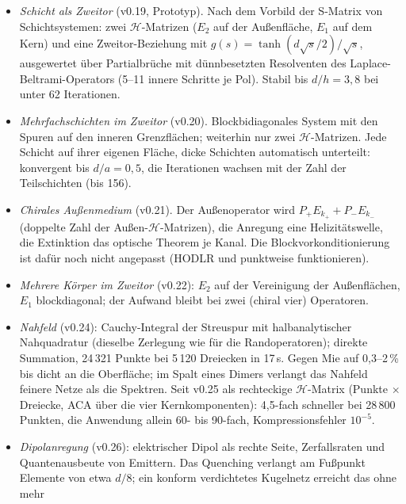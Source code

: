 \documentclass[11pt, a4paper]{article}
\begin{document}
\begin{itemize}[leftmargin=*]
    unverändert; der CD einer dünnen chiralen Hülle auf Gold konvergiert mit Ordnung~2 gegen eine Mie-Lösung für
    geschichtete chirale Kugeln (0,5--1\,\% bei $n=12$), die exakte Zwei-Flächen-Rechnung verfehlt ihn um 30--50\,\%.
    Spektrum einer Goldkugel mit chiraler Molekülhülle (v0.18): plasmoninduzierter CD an der Resonanz auf 2--7\,\%.
  \item \emph{Schicht als Zweitor} (v0.19, Prototyp). Nach dem Vorbild der S-Matrix von Schichtsystemen: zwei
    $\mathcal{H}$-Matrizen ($E_2$ auf der Außenfläche, $E_1$ auf dem Kern) und eine Zweitor-Beziehung mit
    $g(s)=\tanh(d\sqrt s/2)/\sqrt s$, ausgewertet über Partialbrüche mit dünnbesetzten Resolventen des
    Laplace-Beltrami-Operators (5--11 innere Schritte je Pol). Stabil bis $d/h=3{,}8$ bei unter 62 Iterationen.
  \item \emph{Mehrfachschichten im Zweitor} (v0.20). Blockbidiagonales System mit den Spuren auf den inneren
    Grenzflächen; weiterhin nur zwei $\mathcal{H}$-Matrizen. Jede Schicht auf ihrer eigenen Fläche, dicke Schichten
    automatisch unterteilt: konvergent bis $d/a=0{,}5$, die Iterationen wachsen mit der Zahl der Teilschichten (bis 156).
  \item \emph{Chirales Außenmedium} (v0.21). Der Außenoperator wird $P_+E_{k_+}+P_-E_{k_-}$ (doppelte Zahl der
    Außen-$\mathcal{H}$-Matrizen), die Anregung eine Helizitätswelle, die Extinktion das optische Theorem je Kanal. Die
    Blockvorkonditionierung ist dafür noch nicht angepasst (HODLR und punktweise funktionieren).
  \item \emph{Mehrere Körper im Zweitor} (v0.22): $E_2$ auf der Vereinigung der Außenflächen, $E_1$ blockdiagonal; der
    Aufwand bleibt bei zwei (chiral vier) Operatoren.
  \item \emph{Nahfeld} (v0.24): Cauchy-Integral der Streuspur mit halbanalytischer Nahquadratur (dieselbe Zerlegung wie für
    die Randoperatoren); direkte Summation, 24\,321 Punkte bei 5\,120 Dreiecken in 17\,s. Gegen Mie auf 0,3--2\,\% bis dicht an
    die Oberfläche; im Spalt eines Dimers verlangt das Nahfeld feinere Netze als die Spektren. Seit v0.25 als rechteckige
    $\mathcal{H}$-Matrix (Punkte $\times$ Dreiecke, ACA über die vier Kernkomponenten): 4,5-fach schneller bei 28\,800 Punkten,
    die Anwendung allein 60- bis 90-fach, Kompressionsfehler $10^{-5}$.
  \item \emph{Dipolanregung} (v0.26): elektrischer Dipol als rechte Seite, Zerfallsraten und Quantenausbeute von Emittern.
    Das Quenching verlangt am Fußpunkt Elemente von etwa $d/8$; ein konform verdichtetes Kugelnetz erreicht das ohne mehr

\end{itemize}
\end{document}
